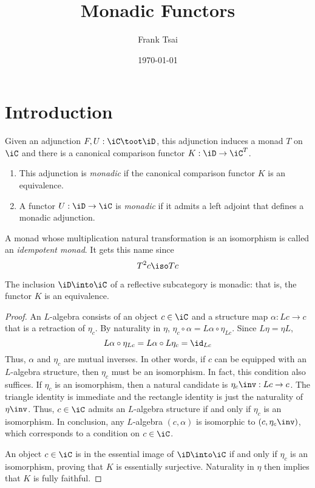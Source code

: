 \documentclass{amsart}
\title{Monadic Functors}
\author{Frank Tsai}
\date{\today}
\begin{document}
\maketitle
\tableofcontents

\section{Introduction}
\label{sec:introduction}
\begin{defn}
  Given an adjunction $F,U : \iC \toot \iD$, this adjunction induces a monad $T$ on $\iC$ and there is a canonical comparison functor $K : \iD \to \iC^{T}$.
  \begin{enumerate}
  \item This adjunction is \emph{monadic} if the canonical comparison functor $K$ is an equivalence.
  \item A functor $U : \iD \to \iC$ is \emph{monadic} if it admits a left adjoint that defines a monadic adjunction.
  \end{enumerate}
\end{defn}

\begin{defn}
  A monad whose multiplication natural transformation is an isomorphism is called an \emph{idempotent monad}.
  It gets this name since
  \[
    T^{2}c \iso Tc
  \]
\end{defn}

\begin{lem}
  The inclusion $\iD \into \iC$ of a reflective subcategory is monadic: that is, the functor $K$ is an equivalence.
  
\end{lem}
\begin{proof}
  An $L$-algebra consists of an object $c \in \iC$ and a structure map $\alpha : Lc \to c$ that is a retraction of $\eta_{c}$.
  By naturality in $\eta$, $\eta_{c} \circ \alpha = L\alpha \circ \eta_{Lc}$.
  Since $L\eta = \eta L$,
  \[
    L\alpha \circ \eta_{Lc} = L\alpha \circ L\eta_{c} = \id_{Lc}
  \]
  Thus, $\alpha$ and $\eta_{c}$ are mutual inverses.
  In other words, if $c$ can be equipped with an $L$-algebra structure, then $\eta_{c}$ must be an isomorphism.
  In fact, this condition also suffices.
  If $\eta_{c}$ is an isomorphism, then a natural candidate is $\eta_{c}\inv : Lc \to c$.
  The triangle identity is immediate and the rectangle identity is just the naturality of $\eta\inv$.
  Thus, $c \in \iC$ admits an $L$-algebra structure if and only if $\eta_{c}$ is an isomorphism.
  In conclusion, any $L$-algebra $(c,\alpha)$ is isomorphic to $(c,\eta_{c}\inv)$, which corresponds to a condition on $c \in \iC$.
  
  An object $c \in \iC$ is in the essential image of $\iD \into \iC$ if and only if $\eta_{c}$ is an isomorphism, proving that $K$ is essentially surjective.
  Naturality in $\eta$ then implies that $K$ is fully faithful.
  
\end{proof}
\end{document}

